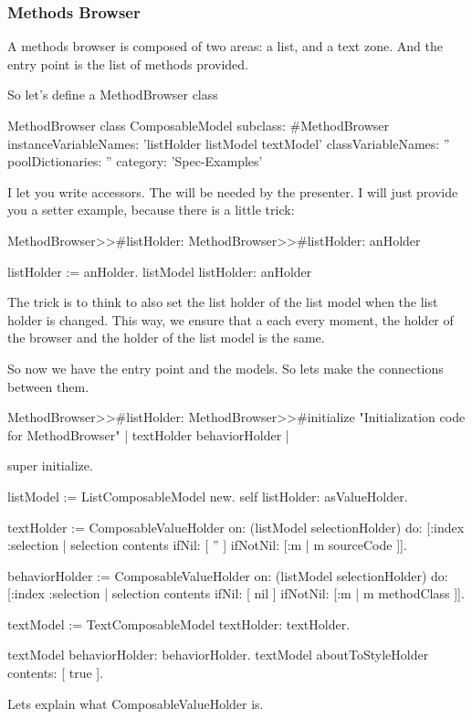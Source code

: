 \documentclass[a4paper,10pt,twoside]{book}
\begin{document}
\subsubsection{Methods Browser}

A methods browser is composed of two areas: a list, and a text zone. And the entry point is the list of methods provided.

So let's define a MethodBrowser class

\begin{classdef}{MethodBrowser class}
ComposableModel subclass: #MethodBrowser
	instanceVariableNames: 'listHolder listModel textModel'
	classVariableNames: ''
	poolDictionaries: ''
	category: 'Spec-Examples'
\end{classdef}

I let you write accessors. The will be needed by the presenter.
I will just provide you a setter example, because there is a little trick:

\begin{method}{MethodBrowser>>\#listHolder:}
MethodBrowser>>#listHolder: anHolder
	
	listHolder := anHolder.
	listModel listHolder: anHolder
\end{method}

The trick is to think to also set the list holder of the list model when the list holder is changed. This way, we ensure that a each every moment, the holder of the browser and the holder of the list model is the same.

So now we have the entry point and the models. So lets make the connections between them.

\begin{method}{MethodBrowser>>\#listHolder:}
MethodBrowser>>#initialize
	"Initialization code for MethodBrowser"
	| textHolder behaviorHolder |
	
	super initialize.

	listModel := ListComposableModel new.
	self listHolder: {} asValueHolder.
	
	textHolder := ComposableValueHolder on: (listModel selectionHolder) do: [:index :selection | selection contents 
		ifNil: [ '' ]
		ifNotNil: [:m | m sourceCode ]].
	
	behaviorHolder := ComposableValueHolder on: (listModel selectionHolder) do: [:index :selection | selection contents 
		ifNil: [ nil ]
		ifNotNil: [:m | m methodClass ]].
	
	textModel := TextComposableModel textHolder: textHolder.

	textModel behaviorHolder: behaviorHolder.
	textModel aboutToStyleHolder contents: [ true ].
\end{method}
Lets explain what ComposableValueHolder is.
\end{document}
